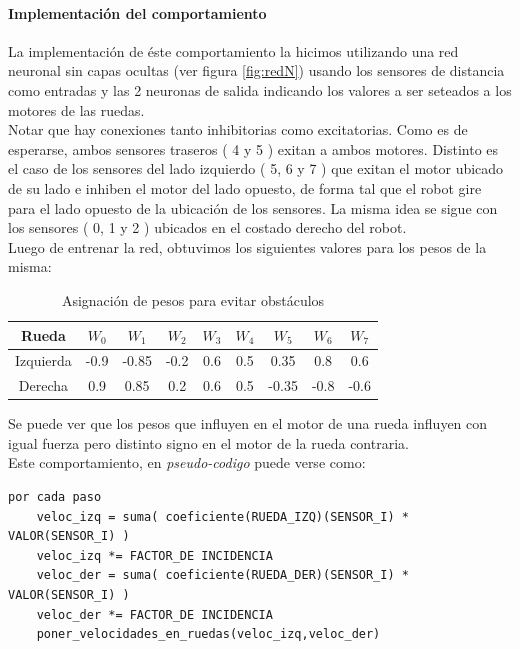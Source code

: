 \paragraph{Implementaci\'on del comportamiento}
La implementaci\'on de \'este comportamiento la hicimos utilizando una red neuronal
sin capas ocultas 
(ver figura \ref{fig:redN}) usando los sensores de distancia como entradas y las
2 neuronas de salida indicando los valores a ser seteados a los motores de las ruedas.
\\
Notar que hay conexiones tanto inhibitorias como excitatorias. Como es de esperarse,
ambos sensores traseros ( 4 y 5 ) exitan a ambos motores. Distinto es el caso de los
sensores del lado izquierdo ( 5, 6 y 7 ) que exitan el motor ubicado de su lado e
inhiben el motor del lado opuesto, de forma tal que el robot gire para el lado
opuesto de la ubicaci\'on de los sensores. La misma idea se sigue con los sensores
( 0, 1 y 2 ) ubicados en el costado derecho del robot.
\\
Luego de entrenar la red, obtuvimos los siguientes valores para los pesos de la
misma:

\begin{table}[ht]
	\begin{center}
		\begin{tabular}{ | c | c | c | c | c | c | c | c | c | }
			\hline 
			Rueda & $W_0$ & $W_1$ & $W_2$ & $W_3$ &  $W_4$ & $W_5$ & $W_6$ & $W_7$ \\
			\hline\hline
			Izquierda & -0.9 & -0.85 & -0.2 & 0.6 & 0.5 & 0.35 & 0.8 & 0.6 \\
			\hline
			Derecha & 0.9 & 0.85 & 0.2 & 0.6 & 0.5 & -0.35 & -0.8 & -0.6 \\
			\hline
		\end{tabular}
	\end{center}
	\label{pesos_obstaculo} 
	\caption{Asignaci\'on de pesos para evitar obst\'aculos}
\end{table}
Se puede ver que los pesos que influyen en el motor de una rueda influyen
con igual fuerza pero distinto signo en el motor de la rueda contraria.
\\
Este comportamiento, en \emph{pseudo-codigo} puede verse como:
\begin{verbatim}
por cada paso
    veloc_izq = suma( coeficiente(RUEDA_IZQ)(SENSOR_I) * VALOR(SENSOR_I) )
    veloc_izq *= FACTOR_DE INCIDENCIA
    veloc_der = suma( coeficiente(RUEDA_DER)(SENSOR_I) * VALOR(SENSOR_I) )
    veloc_der *= FACTOR_DE INCIDENCIA
    poner_velocidades_en_ruedas(veloc_izq,veloc_der)
\end{verbatim}

